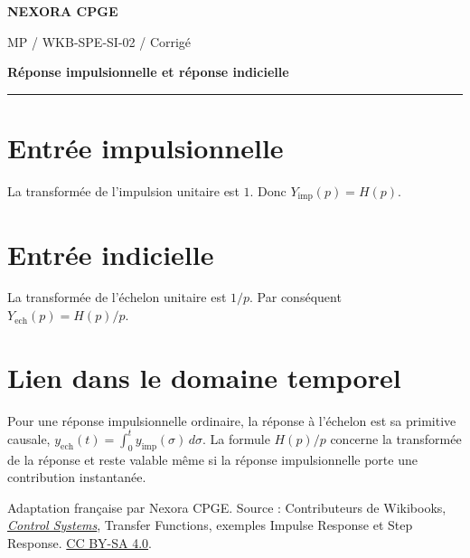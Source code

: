 \documentclass[11pt,a4paper]{article}
\begin{document}
{\small\bfseries\color{nexorablue} NEXORA CPGE}\par
{\small MP / WKB-SPE-SI-02 / Corrigé}\par
{\LARGE\bfseries Réponse impulsionnelle et réponse indicielle}\par
\vspace{0.25em}\hrule\vspace{0.6em}

\section*{Entrée impulsionnelle}
La transformée de l’impulsion unitaire est $1$. Donc $Y_{\mathrm{imp}}(p)=H(p)$.

\section*{Entrée indicielle}
La transformée de l’échelon unitaire est $1/p$. Par conséquent $Y_{\mathrm{ech}}(p)=H(p)/p$.

\section*{Lien dans le domaine temporel}
Pour une réponse impulsionnelle ordinaire, la réponse à l’échelon est sa primitive causale, $y_{\mathrm{ech}}(t)=\int_0^t y_{\mathrm{imp}}(\sigma)\,d\sigma$. La formule $H(p)/p$ concerne la transformée de la réponse et reste valable même si la réponse impulsionnelle porte une contribution instantanée.

\bigskip
{\footnotesize Adaptation française par Nexora CPGE. Source : Contributeurs de Wikibooks,
\href{https://en.wikibooks.org/wiki/Control_Systems/Transfer_Functions\#Using_the_Transfer_Function}{\textit{Control Systems}}, Transfer Functions, exemples Impulse Response et Step Response.
\href{https://creativecommons.org/licenses/by-sa/4.0/}{CC BY-SA 4.0}.}
\end{document}
